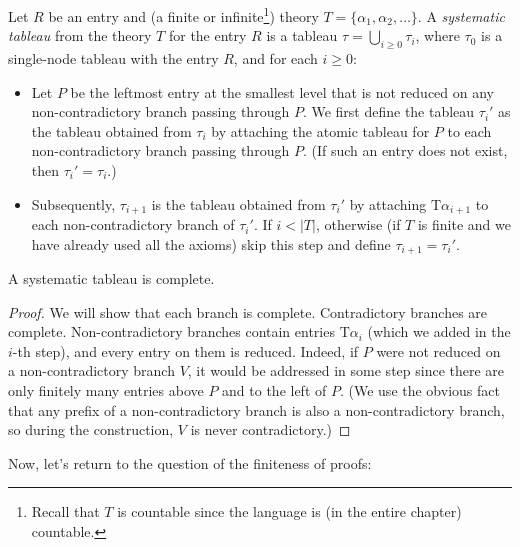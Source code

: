 \begin{definition}
Let $R$ be an entry and (a finite or infinite\footnote{Recall that $T$ is countable since the language is (in the entire chapter) countable.}) theory $T = \{\alpha_1, \alpha_2, \dots\}$. A \emph{systematic tableau} from the theory $T$ for the entry $R$ is a tableau $\tau = \bigcup_{i \geq 0} \tau_i$, where $\tau_0$ is a single-node tableau with the entry $R$, and for each $i \geq 0$:

\begin{itemize}
    \item Let $P$ be the leftmost entry at the smallest level that is not reduced on any non-contradictory branch passing through $P$. We first define the tableau $\tau_i'$ as the tableau obtained from $\tau_i$ by attaching the atomic tableau for $P$ to each non-contradictory branch passing through $P$. (If such an entry does not exist, then $\tau_i' = \tau_i$.)
    \item Subsequently, $\tau_{i+1}$ is the tableau obtained from $\tau_i'$ by attaching $\mathrm{T}\alpha_{i+1}$ to each non-contradictory branch of $\tau_i'$. If $i < |T|$, otherwise (if $T$ is finite and we have already used all the axioms) skip this step and define $\tau_{i+1} = \tau_i'$.
\end{itemize}    
\end{definition}

\begin{lemma}\label{lemma:systematic-is-finished}
    A systematic tableau is complete.
\end{lemma}
\begin{proof}
    We will show that each branch is complete. Contradictory branches are complete. Non-contradictory branches contain entries $\mathrm{T}\alpha_i$ (which we added in the $i$-th step), and every entry on them is reduced. Indeed, if $P$ were not reduced on a non-contradictory branch $V$, it would be addressed in some step since there are only finitely many entries above $P$ and to the left of $P$. (We use the obvious fact that any prefix of a non-contradictory branch is also a non-contradictory branch, so during the construction, $V$ is never contradictory.)
\end{proof}

Now, let's return to the question of the finiteness of proofs:

